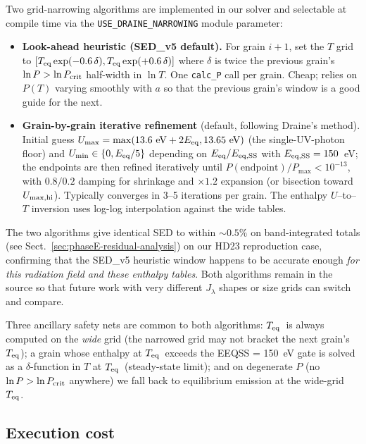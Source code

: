 \documentclass{my_memo}
\newcommand{\Teq}{\ensuremath{T_{\rm eq}}}
\begin{document}
Two grid-narrowing algorithms are
implemented in our solver and selectable at compile time via the
\texttt{USE\_DRAINE\_NARROWING} module parameter:

\begin{itemize}
  \item \textbf{Look-ahead heuristic (SED\_v5 default).} For grain
        $i+1$, set the $T$ grid to
        $[\Teq \exp(-0.6\,\delta), \Teq \exp(+0.6\,\delta)]$ where
        $\delta$ is twice the previous grain's $\ln P > \ln P_{\rm crit}$
        half-width in $\ln T$. One \texttt{calc\_P} call per grain.
        Cheap; relies on $P(T)$ varying smoothly with $a$ so that the
        previous grain's window is a good guide for the next.
  \item \textbf{Grain-by-grain iterative refinement} (default,
        following Draine's method).
        Initial guess
        $U_{\max} = \max(13.6~\mathrm{eV} + 2E_{\rm eq}, 13.65~\mathrm{eV})$
        (the single-UV-photon floor) and
        $U_{\min} \in \{0, E_{\rm eq}/5\}$ depending on
        $E_{\rm eq}/E_{\rm eq,SS}$ with $E_{\rm eq,SS} = 150$~eV; the
        endpoints are then refined iteratively until
        $P(\text{endpoint})/P_{\max} < 10^{-13}$, with $0.8 / 0.2$
        damping for shrinkage and $\times 1.2$ expansion (or bisection
        toward $U_{\max,{\rm hi}}$). Typically converges in 3--5
        iterations per grain. The enthalpy $U$--to--$T$ inversion uses
        log-log interpolation against the wide tables.
\end{itemize}

The two algorithms give identical SED to within $\sim 0.5\%$ on
band-integrated totals (see Sect.~\ref{sec:phaseE-residual-analysis})
on our HD23 reproduction case, confirming that the SED\_v5 heuristic
window happens to be accurate enough \emph{for this radiation field
and these enthalpy tables}. Both algorithms remain in the source so
that future work with very different $J_\lambda$ shapes or size grids
can switch and compare.

Three ancillary safety nets are common to both algorithms: \Teq\ is
always computed on the \emph{wide} grid (the narrowed grid may not
bracket the next grain's \Teq); a grain whose enthalpy at \Teq\
exceeds the EEQSS = 150~eV gate is solved as a $\delta$-function in
$T$ at \Teq\ (steady-state limit); and on degenerate $P$ (no
$\ln P > \ln P_{\rm crit}$ anywhere) we fall back to equilibrium
emission at the wide-grid \Teq.

\subsection{Execution cost}
\end{document}
